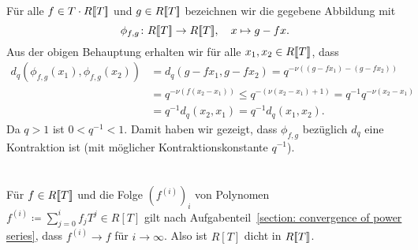 \documentclass[a4paper, 10pt, numbers=noenddot]{scrartcl}
\begin{document}
Für alle $f \in T \cdot R[\![T]\!]$ und $g \in R[\![T]\!]$ bezeichnen wir die gegebene Abbildung mit
\[
  \phi_{f,g} \colon R[\![T]\!] \to R[\![T]\!],
  \quad
  x \mapsto g - fx.
\]
Aus der obigen Behauptung erhalten wir für alle $x_1, x_2 \in R[\![T]\!]$, dass
\begin{align*}
        d_q( \phi_{f,g}(x_1), \phi_{f,g}(x_2) )
  &=    d_q(g - f x_1, g - f x_2)
   =    q^{-\nu((g - f x_1) - (g - f x_2))}
  \\
  &=    q^{-\nu(f (x_2 - x_1))}
  \leq  q^{-(\nu(x_2 - x_1) + 1)}
  =     q^{-1} q^{-\nu(x_2 - x_1)}
  \\
  &=    q^{-1} d_q(x_2, x_1)
  =     q^{-1} d_q(x_1, x_2).
\end{align*}
Da $q > 1$ ist $0 < q^{-1} < 1$.
Damit haben wir gezeigt, dass $\phi_{f,g}$ bezüglich $d_q$ eine Kontraktion ist (mit möglicher Kontraktionskonstante $q^{-1}$).






\section{}

Für $f \in R[\![T]\!]$ und die Folge $(f^{(i)})_i$ von Polynomen $f^{(i)} \coloneqq \sum_{j=0}^i f_j T^j \in R[T]$ gilt nach Aufgabenteil~\ref{section: convergence of power series}, dass $f^{(i)} \to f$ für $i \to \infty$.
Also ist $R[T]$ dicht in $R[\![T]\!]$.
\end{document}
